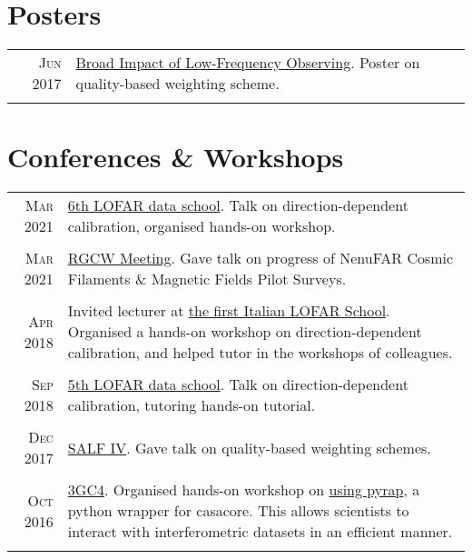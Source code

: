 \documentclass[11pt,a4paper,notitlepage]{article}
\begin{document}
\section{Posters}

\begin{tabular}{r|p{12.5cm}}
	\textsc{Jun 2017} & \href{https://www.radionet-org.eu/radionet/the-broad-impact-of-low-frequency-observing/}{Broad Impact of Low-Frequency Observing}. Poster on quality-based weighting scheme.\\
	\multicolumn{2}{c}{} \\
\end{tabular}

\section{Conferences \& Workshops}

\begin{tabular}{r|p{12.5cm}}
	\textsc{Mar 2021} & \href{https://www.astron.nl/lofarschool2021/}{6th LOFAR data school}. Talk on direction-dependent calibration, organised hands-on workshop.\\
	\multicolumn{2}{c}{} \\
	
	\textsc{Mar 2021} & \href{https://sites.google.com/inaf.it/rgcw-meeting/home-page}{RGCW Meeting}. Gave talk on progress of NenuFAR Cosmic Filaments \& Magnetic Fields Pilot Surveys.\\
	\multicolumn{2}{c}{} \\
	
	\textsc{Apr 2018} & Invited lecturer at \href{https://indico.ced.inaf.it/event/9/}{the first Italian LOFAR School}. Organised a hands-on workshop on direction-dependent calibration, and helped tutor in the workshops of colleagues.\\
	\multicolumn{2}{c}{} \\
	
	\textsc{Sep 2018} & \href{https://www.astron.nl/lofarschool2018/}{5th LOFAR data school}. Talk on direction-dependent calibration, tutoring hands-on tutorial.\\
	\multicolumn{2}{c}{} \\
	
	\textsc{Dec 2017} & \href{http://www.physics.usyd.edu.au/salf_iv/}{SALF IV}. Gave talk on quality-based weighting schemes.\\
	\multicolumn{2}{c}{} \\
	
	\textsc{Oct 2016} & \href{http://www.ast.uct.ac.za/ast/meetings-workshops/3gc4}{3GC4}. Organised hands-on workshop on \href{https://github.com/ebonnassieux/Teaching/blob/master/PyrapTutorial.ipynb}{using pyrap}, a python wrapper for casacore. This allows scientists to interact with interferometric datasets in an efficient manner.\\
	\multicolumn{2}{c}{} \\
	
\end{tabular}







\end{document}
